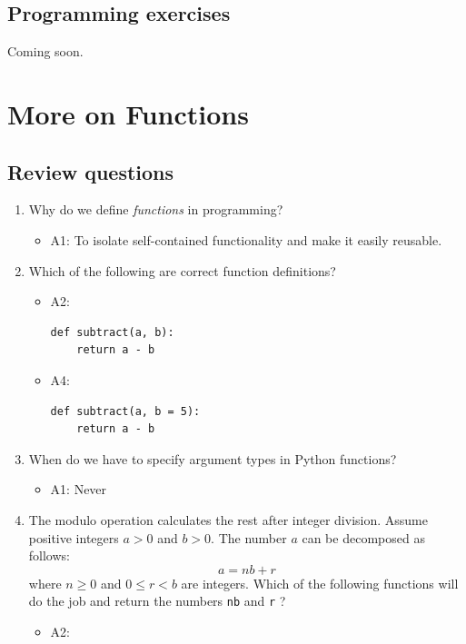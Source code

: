 \documentclass[article,A4,12pt]{llncs}
\begin{document}
\subsection{Programming exercises}

Coming soon.


\section{More on Functions}

\subsection{Review questions}

\begin{enumerate}
\item Why do we define {\em functions} in programming? 
  \begin{itemize}
    \item A1: To isolate self-contained functionality and make it easily reusable.
  \end{itemize}
\item Which of the following are correct function definitions?
  \begin{itemize}
    \item A2:
\begin{verbatim}
def subtract(a, b):
    return a - b
\end{verbatim}
    \item A4:
\begin{verbatim}
def subtract(a, b = 5):
    return a - b
\end{verbatim}
  \end{itemize}
\item When do we have to specify argument types in Python functions?
  \begin{itemize}
    \item A1: Never
  \end{itemize}
\item The modulo operation calculates the 
      rest after integer division. Assume positive integers $a > 0$ and $b > 0$.
      The number $a$ can be decomposed as follows:
      $$
      a = nb + r
      $$  
      where $n \ge 0$ and $0 \le r < b$ are integers.
      Which of the following functions will do the job
      and return the numbers {\tt nb} and {\tt r} ?
  \begin{itemize}
    \item A2:
\begin{verbatim}

\end{verbatim}
\end{itemize}
\end{enumerate}
\end{document}

